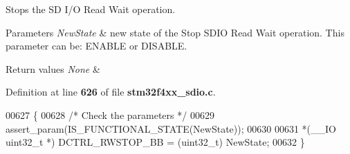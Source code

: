 Stops the SD I/O Read Wait operation. 


\begin{DoxyParams}{Parameters}
{\em New\+State} & new state of the Stop S\+D\+IO Read Wait operation. This parameter can be\+: E\+N\+A\+B\+LE or D\+I\+S\+A\+B\+LE. \\
\hline
\end{DoxyParams}

\begin{DoxyRetVals}{Return values}
{\em None} & \\
\hline
\end{DoxyRetVals}


Definition at line \textbf{ 626} of file \textbf{ stm32f4xx\+\_\+sdio.\+c}.


\begin{DoxyCode}
00627 \{ 
00628   \textcolor{comment}{/* Check the parameters */}
00629   assert_param(IS_FUNCTIONAL_STATE(NewState));
00630   
00631   *(\_\_IO uint32\_t *) DCTRL_RWSTOP_BB = (uint32\_t) NewState;
00632 \}
\end{DoxyCode}

